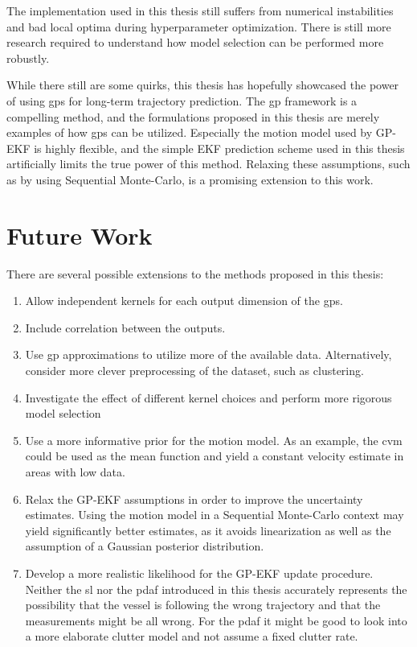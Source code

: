 The implementation used in this thesis still suffers from numerical instabilities and bad local optima during hyperparameter optimization. There is still more research required to understand how model selection can be performed more robustly. 

While there still are some quirks, this thesis has hopefully showcased the power of using \acrshort{gp}s for long-term trajectory prediction. The \acrshort{gp} framework is a compelling method, and the formulations proposed in this thesis are merely examples of how \acrshort{gp}s can be utilized. Especially the motion model used by GP-EKF is highly flexible, and the simple EKF prediction scheme used in this thesis artificially limits the true power of this method. Relaxing these assumptions, such as by using Sequential Monte-Carlo, is a promising extension to this work. 


\section{Future Work}
There are several possible extensions to the methods proposed in this thesis:
\begin{enumerate}
    \item Allow independent kernels for each output dimension of the \acrshort{gp}s.
    \item Include correlation between the outputs. 
    \item Use \acrshort{gp} approximations to utilize more of the available data. Alternatively, consider more clever preprocessing of the dataset, such as clustering.
    \item Investigate the effect of different kernel choices and perform more rigorous model selection
    \item Use a more informative prior for the motion model. As an example, the \acrshort{cvm} could be used as the mean function and yield a constant velocity estimate in areas with low data.
    \item Relax the GP-EKF assumptions in order to improve the uncertainty estimates. Using the motion model in a Sequential Monte-Carlo context may yield significantly better estimates, as it avoids linearization as well as the assumption of a Gaussian posterior distribution.
    \item Develop a more realistic likelihood for the GP-EKF update procedure. Neither the \acrshort{sl} nor the \acrshort{pdaf} introduced in this thesis accurately represents the possibility that the vessel is following the wrong trajectory and that the measurements might be all wrong. For the \acrshort{pdaf} it might be good to look into a more elaborate clutter model and not assume a fixed clutter rate.  
\end{enumerate}
